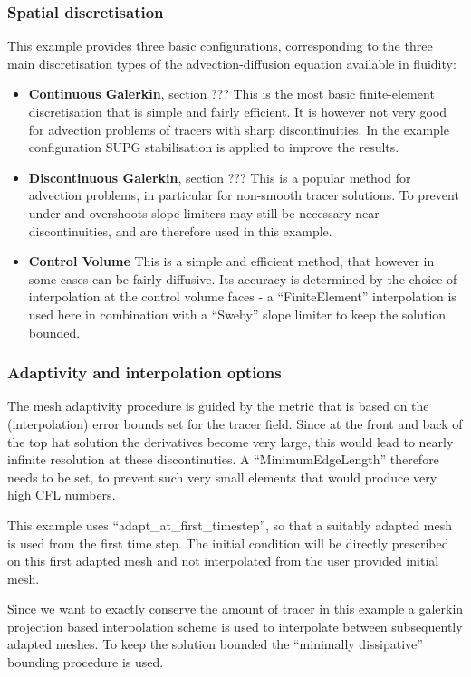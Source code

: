 \subsubsection{Spatial discretisation}
This example provides three basic configurations, corresponding to
the three main discretisation types of the advection-diffusion equation
available in fluidity:
\begin{itemize}
\item {\bf Continuous Galerkin}, section ???
This is the most basic finite-element discretisation that is simple 
and fairly efficient. It is however not very good for advection problems
of tracers with sharp discontinuities. In the example configuration
SUPG stabilisation is applied to improve the results.
\item {\bf Discontinuous Galerkin}, section ???
This is a popular method for advection problems, in particular 
for non-smooth tracer solutions. To prevent under and overshoots
slope limiters may still be necessary near discontinuities, and are
therefore used in this example.
\item {\bf Control Volume}
This is a simple and efficient method, that however in some cases 
can be fairly diffusive. Its accuracy is determined by the choice 
of interpolation at the control volume faces - a ``FiniteElement''
interpolation is used here in combination with a ``Sweby'' slope 
limiter to keep the solution bounded. 
\end{itemize}

\subsubsection{Adaptivity and interpolation options}
The mesh adaptivity procedure is guided by the metric that is based on
the (interpolation) error bounds set for the tracer field. Since at 
the front and back of the top hat solution the derivatives 
become very large, this would lead to nearly infinite resolution at these
discontinuties. A ``MinimumEdgeLength'' therefore needs to be set, to prevent
such very small elements that would produce very high CFL numbers.

This example uses ``adapt\_at\_first\_timestep'', so that a suitably
adapted mesh is used from the first time step. The initial condition
will be directly prescribed on this first adapted mesh and not interpolated
from the user provided initial mesh.

Since we want to exactly conserve the amount of tracer in this example
a galerkin projection based interpolation scheme is used to interpolate
between subsequently adapted meshes. To keep the solution bounded the
``minimally dissipative'' bounding procedure is used.

